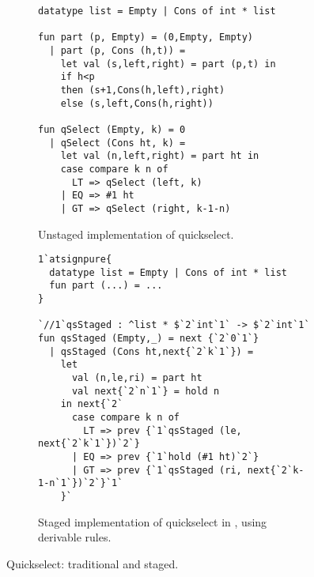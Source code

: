 
\begin{figure*}
\begin{subfigure}{0.5\textwidth}
\begin{lstlisting} 
datatype list = Empty | Cons of int * list

fun part (p, Empty) = (0,Empty, Empty) 
  | part (p, Cons (h,t)) = 
    let val (s,left,right) = part (p,t) in 
    if h<p 
    then (s+1,Cons(h,left),right) 
    else (s,left,Cons(h,right))

fun qSelect (Empty, k) = 0
  | qSelect (Cons ht, k) =
    let val (n,left,right) = part ht in
    case compare k n of
      LT => qSelect (left, k)
    | EQ => #1 ht
    | GT => qSelect (right, k-1-n)
\end{lstlisting}
\caption{Unstaged implementation of quickselect.}
\label{fig:qs-unstaged}
\end{subfigure}%
\begin{subfigure}{0.5\textwidth}
\begin{lstlisting} 
1`atsignpure{
  datatype list = Empty | Cons of int * list
  fun part (...) = ...
} 

`//1`qsStaged : ^list * $`2`int`1` -> $`2`int`1`
fun qsStaged (Empty,_) = next {`2`0`1`}
  | qsStaged (Cons ht,next{`2`k`1`}) = 
    let 
      val (n,le,ri) = part ht
      val next{`2`n`1`} = hold n 
    in next{`2`
      case compare k n of
        LT => prev {`1`qsStaged (le, next{`2`k`1`})`2`}
      | EQ => prev {`1`hold (#1 ht)`2`}
      | GT => prev {`1`qsStaged (ri, next{`2`k-1-n`1`})`2`}`1`
    }`
\end{lstlisting}
\caption{Staged implementation of quickselect in \lang, using derivable rules.}
\vspace{1.3em}
\label{fig:qs-staged}
\end{subfigure}
\caption{Quickselect: traditional and staged.}
\end{figure*}



